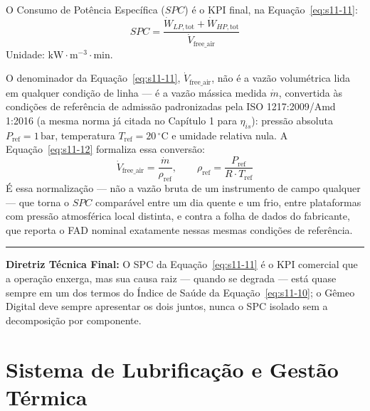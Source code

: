 \documentclass[12pt,a4paper]{article}
\numberwithin{equation}{section}
\numberwithin{table}{section}
\numberwithin{figure}{section}
\begin{document}
{	O Consumo de Potência Específica ($SPC$) é o KPI final, na Equação~\eqref{eq:s11-11}:
	\begin{equation}\label{eq:s11-11}
 \boxed{SPC = \frac{\dot{W}_{LP,\text{tot}} + \dot{W}_{HP,\text{tot}}}{\dot{V}_{\text{free\_air}}}} 
\end{equation}
	Unidade: $\text{kW} \cdotp \text{m}^{-3} \cdotp \text{min}$.

	O denominador da Equação~\eqref{eq:s11-11}, $\dot{V}_{\text{free\_air}}$, não é a vazão volumétrica lida em qualquer condição de linha — é a vazão mássica medida $\dot{m}$, convertida às condições de referência de admissão padronizadas pela ISO 1217:2009/Amd 1:2016 \cite{iso1217} (a mesma norma já citada no Capítulo 1 para $\eta_{is}$): pressão absoluta $P_{\text{ref}} = 1\,\text{bar}$, temperatura $T_{\text{ref}} = 20\,^{\circ}\text{C}$ e umidade relativa nula. A Equação~\eqref{eq:s11-12} formaliza essa conversão:
	\begin{equation}\label{eq:s11-12}
 \dot{V}_{\text{free\_air}} = \frac{\dot{m}}{\rho_{\text{ref}}}, \qquad \rho_{\text{ref}} = \frac{P_{\text{ref}}}{R \cdot T_{\text{ref}}}
\end{equation}
	É essa normalização — não a vazão bruta de um instrumento de campo qualquer — que torna o $SPC$ comparável entre um dia quente e um frio, entre plataformas com pressão atmosférica local distinta, e contra a folha de dados do fabricante, que reporta o FAD nominal exatamente nessas mesmas condições de referência.

	\vspace{1em}
	\hrule
	\vspace{1em}

	\textbf{Diretriz Técnica Final:} O SPC da Equação~\eqref{eq:s11-11} é o KPI comercial que a operação enxerga, mas sua causa raiz — quando se degrada — está quase sempre em um dos termos do Índice de Saúde da Equação~\eqref{eq:s11-10}; o Gêmeo Digital deve sempre apresentar os dois juntos, nunca o SPC isolado sem a decomposição por componente.

	
	
	\clearpage
	\section{\textbf{Sistema de Lubrificação e Gestão Térmica}}

}
\end{document}
